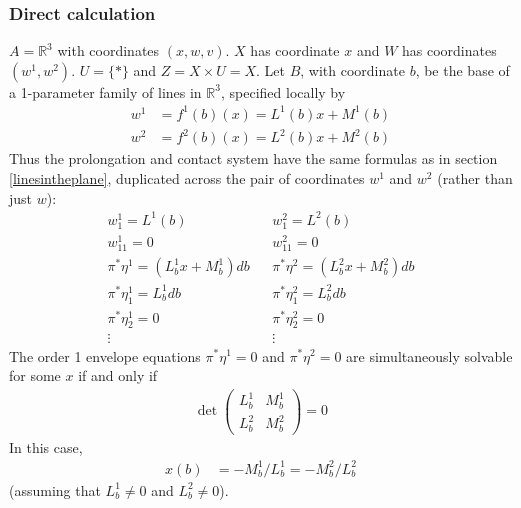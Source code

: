 \documentclass[12pt]{article}
\numberwithin{equation}{section}
\theoremstyle{plain}
\theoremstyle{definition}
\newcommand{\R}{\mathbb{R}}
\begin{document}
\subsubsection{Direct calculation}\label{spacelinesCoordinates}
$A=\R^{3}$ with coordinates $(x,w,v)$. $X$ has coordinate $x$ and $W$ has coordinates $(w^{1},w^{2})$. $U=\{*\}$ and $Z=X\times U=X$. Let $B$, with coordinate $b$, be the base of a 1-parameter family of lines in $\R^{3}$, specified locally by
\begin{align*}
w^{1}&=f^{1}(b)(x)=L^{1}(b)x+M^{1}(b)\\
w^{2}&=f^{2}(b)(x)=L^{2}(b)x+M^{2}(b)
\end{align*}
Thus the prolongation and contact system have the same formulas as in section \ref{linesintheplane}, duplicated across the pair of coordinates $w^{1}$ and $w^{2}$ (rather than just $w$):
\begin{align*}
&w^{1}_{1}=L^{1}(b)& &w^{2}_{1}=L^{2}(b)& \\
&w^{1}_{11}=0& &w^{2}_{11}=0& \\
&\pi^{*}\eta^{1}=(L^{1}_{b}x+M^{1}_{b})db& &\pi^{*}\eta^{2}=(L^{2}_{b}x+M^{2}_{b})db& \\
&\pi^{*}\eta^{1}_{1}=L^{1}_{b}db& &\pi^{*}\eta^{2}_{1}=L^{2}_{b}db&\\
&\pi^{*}\eta^{1}_{2}=0& &\pi^{*}\eta^{2}_{2}=0&\\
&\vdots& &\vdots&
\end{align*}
The order 1 envelope equations $\pi^{*}\eta^{1}=0$ and $\pi^{*}\eta^{2}=0$ are simultaneously solvable for some $x$ if and only if 
\begin{align}\label{nullconditionCoordinates}
\det\begin{pmatrix}
L^{1}_{b} & M^{1}_{b} \\
L^{2}_{b} & M^{2}_{b} 
\end{pmatrix}=0
\end{align}
In this case,
\begin{align}\label{envelopelinesCoordinates}
x(b)&=-M^{1}_{b}/L^{1}_{b}=-M^{2}_{b}/L^{2}_{b}
\end{align}
(assuming that $L^{1}_{b}\neq 0$ and $L^{2}_{b}\neq 0$).
\end{document}
